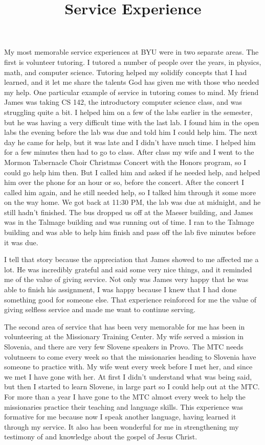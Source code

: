 \documentclass[onecolumn, 12pt]{article}
\title{Service Experience}
\author{}
\date{}
\begin{document}
\maketitle

My most memorable service experiences at BYU were in two separate areas.  The
first is volunteer tutoring.  I tutored a number of people over the years, in
physics, math, and computer science.  Tutoring helped my solidify concepts that
I had learned, and it let me share the talents God has given me with those who
needed my help.  One particular example of service in tutoring comes to mind.
My friend James was taking CS 142, the introductory computer science class, and
was struggling quite a bit.  I helped him on a few of the labs earlier in the
semester, but he was having a very difficult time with the last lab.  I found
him in the open labs the evening before the lab was due and told him I could
help him.  The next day he came for help, but it was late and I didn't have
much time.  I helped him for a few minutes then had to go to class.  After
class my wife and I went to the Mormon Tabernacle Choir Christmas Concert with
the Honors program, so I could go help him then.  But I called him and asked if
he needed help, and helped him over the phone for an hour or so, before the
concert.  After the concert I called him again, and he still needed help, so I
talked him through it some more on the way home.  We got back at 11:30 PM, the
lab was due at midnight, and he still hadn't finished.  The bus dropped us off
at the Maeser building, and James was in the Talmage building and was running
out of time.  I ran to the Talmage building and was able to help him finish and
pass off the lab five minutes before it was due.  

I tell that story because the appreciation that James showed to me affected me
a lot.  He was incredibly grateful and said some very nice things, and it
reminded me of the value of giving service.  Not only was James very happy that
he was able to finish his assignment, I was happy because I knew that I had
done something good for someone else.  That experience reinforced for me the
value of giving selfless service and made me want to continue serving.

The second area of service that has been very memorable for me has been in
volunteering at the Missionary Training Center.  My wife served a mission in
Slovenia, and there are very few Slovene speakers in Provo.  The MTC needs
volutneers to come every week so that the missionaries heading to Slovenia have
someone to practice with.  My wife went every week before I met her, and since
we met I have gone with her.  At first I didn't understand what was being said,
but then I started to learn Slovene, in large part so I could help out at the
MTC.  For more than a year I have gone to the MTC almost every week to help the
missionaries practice their teaching and language skills.  This experience was
formative for me because now I speak another language, having learned it
through my service.  It also has been wonderful for me in strengthening my
testimony of and knowledge about the gospel of Jesus Christ.  
\end{document}
